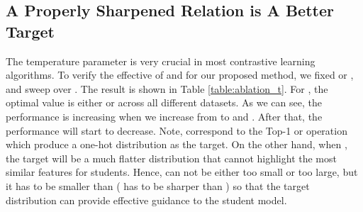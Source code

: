 \documentclass{article}
\newcommand{\<}{\left\langle}
\renewcommand{\>}{\right\rangle}
\begin{document}
\subsection{A Properly Sharpened Relation is A Better Target}
The temperature parameter is very crucial in most contrastive learning algorithms. To verify the effective of  and  for our proposed method, we fixed  or , and sweep over . The result is shown in Table \ref{table:ablation_t}. For , the optimal value is either  or  across all different datasets. As we can see, the performance is increasing when we increase  from  to  and . After that, the performance will start to decrease. Note,  correspond to the Top-1 or  operation which produce a one-hot distribution as the target. On the other hand, when , the target will be a much flatter distribution that cannot highlight the most similar features for students. Hence,  can not be either too small or too large, but it has to be smaller than  ( has to be sharper than ) so that the target distribution can provide effective guidance to the student model.
\vspace{-5pt}
\end{document}

